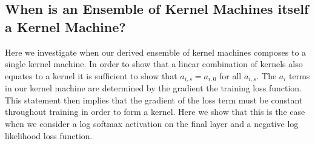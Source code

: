 
\subsection{When is an Ensemble of Kernel Machines itself a Kernel Machine?}
\label{proof:ekmr}
Here we investigate when our derived ensemble of kernel machines composes to a single kernel machine.
In order to show that a linear combination of kernels also equates to a kernel it is sufficient to show that $a_{i,s} = a_{i,0}$ for all $a_{i,s}$.
The $a_{i}$ terms in our kernel machine are determined by the gradient the training loss function.
This statement then implies that the gradient of the loss term must be constant throughout training in order to form a kernel.
Here we show that this is the case when we consider a log softmax activation on the final layer and a negative log likelihood loss function.

